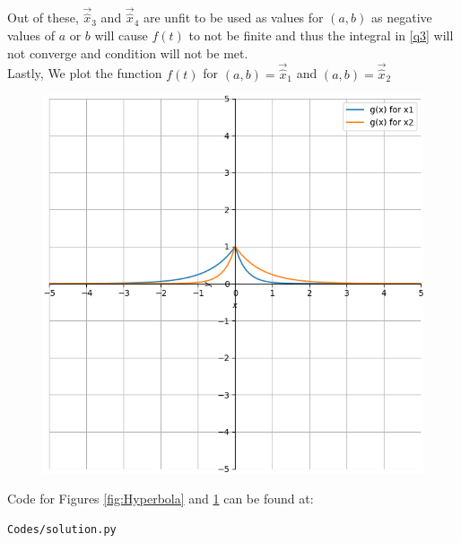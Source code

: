 \documentclass[journal]{IEEEtran}
\begin{document}
Out of these, $\vec{\hat{x}}_3$ and $\vec{\hat{x}}_4$ are unfit to be used as values for $(a, b)$ as negative values of $a$ or $b$ will cause $f(t)$ to not be finite and thus the integral in \eqref{q3} will not converge and condition will not be met.\\

Lastly, We plot the function $f(t)$ for $(a, b) = \vec{\hat{x}}_1$ and $(a, b) = \vec{\hat{x}}_2$

\begin{figure}[H]
	\centering
	\includegraphics[width=0.75\columnwidth]{Figures/function.png} 
	\caption{}
	\label{fig:Function}
\end{figure} 

Code for Figures \ref{fig:Hyperbola} and \ref{fig:Function} can be found at:
\begin{lstlisting}
Codes/solution.py
\end{lstlisting}
\end{document}

